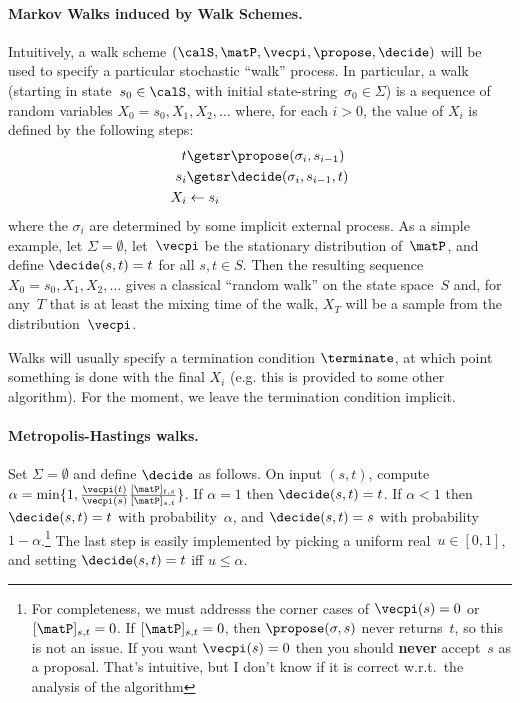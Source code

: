 \paragraph{Markov Walks induced by Walk Schemes. }
Intuitively, a walk scheme $(\calS,\matP,\vecpi,\propose,\decide)$
will be used to specify a particular stochastic ``walk'' process. In
particular, a walk (starting in
state~$s_0 \in \calS$, with initial state-string~$\sigma_0\in\Sigma$) is a sequence of random variables $X_0 = s_0,
X_1, X_2, \ldots $ where, for each $i > 0$, the value of $X_i$ is
defined by the following steps: 
\begin{align*}
t &\getsr \propose(\sigma_i,s_{i-1})\\
s_{i} &\getsr \decide(\sigma_i,s_{i-1},t)\\
X_i &\gets s_{i}
\end{align*}
where the $\sigma_i$ are determined by some implicit external process.
As a simple example, let $\Sigma=\emptyset$, let~$\vecpi$ be the
stationary distribution of~$\matP$, and define $\decide(s,t)=t$ for
all $s,t \in S$.  Then the resulting sequence $X_0=s_0,X_1,X_2,\ldots$
gives a classical ``random walk'' on the state space~$S$ and, for
any~$T$ that is at least the mixing time of the walk, $X_T$ will be a
sample from the distribution~$\vecpi$.  

Walks will usually specify a termination condition $\terminate$, at which point
something is done with the final $X_i$ (e.g. this is provided to some
other algorithm).  For the moment, we leave the termination condition implicit.

\paragraph{Metropolis-Hastings walks.} Set $\Sigma=\emptyset$ and
define $\decide$ as follows.  On input $(s,t)$, compute $\alpha =
\min\{1,\frac{\vecpi(t)}{\vecpi(s)}\frac{[\matP]_{t,s}}{[\matP]_{s,t}}\}$.
If $\alpha=1$ then $\decide(s,t)=t$.  If $\alpha < 1$ then
$\decide(s,t)=t$ with probability~$\alpha$, and $\decide(s,t)=s$ with
probability $1-\alpha$.\footnote{For completeness, we must addresss
  the corner cases of $\vecpi(s)=0$ or $[\matP]_{s,t}=0$.  
If $[\matP]_{s,t}=0$, then $\propose(\sigma,s)$ never
 returns~$t$, so this is not an issue. If
  you want $\vecpi(s)=0$ then you should \textbf{never} accept~$s$ as
  a proposal.  That's intuitive, but I don't know if it is correct
  w.r.t.\ the analysis of the algorithm  } 
The last step is easily implemented by
picking a uniform real~$u \in [0,1]$, and setting $\decide(s,t)=t$ iff
$u \leq \alpha$.

